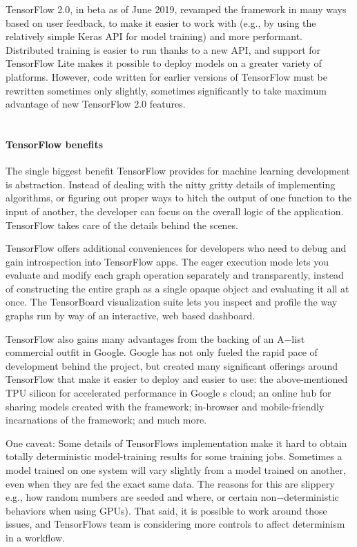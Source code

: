 \documentclass[11pt]{article}
\begin{document}
TensorFlow 2.0, in beta as of June 2019, revamped the framework in many ways based on user feedback, to make it easier to work with (e.g., by using the relatively simple Keras API for model training) and more performant. Distributed training is easier to run thanks to a new API, and support for TensorFlow Lite makes it possible to deploy models on a greater variety of platforms. However, code written for earlier versions of TensorFlow must be rewritten sometimes only slightly, sometimes significantly to take maximum advantage of new TensorFlow 2.0 features.\\\\

\paragraph{TensorFlow benefits}

The single biggest benefit TensorFlow provides for machine learning development is abstraction. Instead of dealing with the nitty gritty details of implementing algorithms, or figuring out proper ways to hitch the output of one function to the input of another, the developer can focus on the overall logic of the application. TensorFlow takes care of the details behind the scenes.

TensorFlow offers additional conveniences for developers who need to debug and gain introspection into TensorFlow apps. The eager execution mode lets you evaluate and modify each graph operation separately and transparently, instead of constructing the entire graph as a single opaque object and evaluating it all at once. The TensorBoard visualization suite lets you inspect and profile the way graphs run by way of an interactive, web based dashboard.

TensorFlow also gains many advantages from the backing of an A$-$list commercial outfit in Google. Google has not only fueled the rapid pace of development behind the project, but created many significant offerings around TensorFlow that make it easier to deploy and easier to use: the above-mentioned TPU silicon for accelerated performance in Google s \textquotesingle  cloud; an online hub for sharing models created with the framework; in-browser and mobile-friendly incarnations of the framework; and much more.

One caveat: Some details of TensorFlow\textquotesingle s implementation make it hard to obtain totally deterministic model-training results for some training jobs. Sometimes a model trained on one system will vary slightly from a model trained on another, even when they are fed the exact same data. The reasons for this are slippery e.g., how random numbers are seeded and where, or certain non$-$deterministic behaviors when using GPUs). That said, it is possible to work around those issues, and TensorFlow\textquotesingle s team is considering more controls to affect determinism in a workflow.
\end{document}
